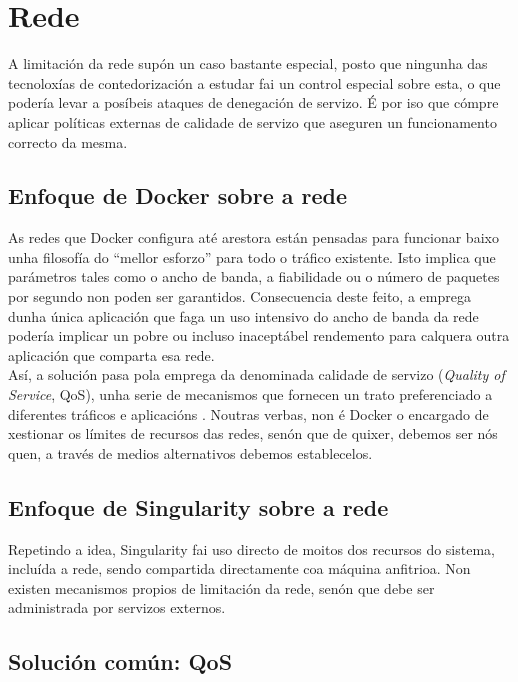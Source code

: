 \section{Rede}
\label{QoSRede}

A limitación da rede supón un caso bastante especial, posto que ningunha das tecnoloxías de contedorización a estudar fai un control especial sobre esta, o que podería levar a posíbeis ataques de denegación de servizo. É por iso que cómpre aplicar políticas externas de calidade de servizo que aseguren un funcionamento correcto da mesma.

\subsection{Enfoque de Docker sobre a rede}

As redes que Docker configura até arestora están pensadas para funcionar baixo unha filosofía do ``mellor esforzo'' para todo o tráfico existente. Isto implica que parámetros tales como o ancho de banda, a fiabilidade ou o número de paquetes por segundo non poden ser garantidos. Consecuencia deste feito, a emprega dunha única aplicación que faga un uso intensivo do ancho de banda da rede podería implicar un pobre ou incluso inaceptábel rendemento para calquera outra aplicación que comparta esa rede.\\

Así, a solución pasa pola emprega da denominada calidade de servizo (\textit{Quality of Service}, \gls{QoS}), unha serie de mecanismos que fornecen un trato preferenciado a diferentes tráficos e aplicacións \cite{dockerQoS}. Noutras verbas, non é Docker o encargado de xestionar os límites de recursos das redes, senón que de quixer, debemos ser nós quen, a través de medios alternativos debemos establecelos.

\subsection{Enfoque de Singularity sobre a rede}

Repetindo a idea, Singularity fai uso directo de moitos dos recursos do sistema, incluída a rede, sendo compartida directamente coa máquina anfitrioa. Non existen mecanismos propios de limitación da rede, senón que debe ser administrada por servizos externos.

\subsection{Solución común: \gls{QoS}}

